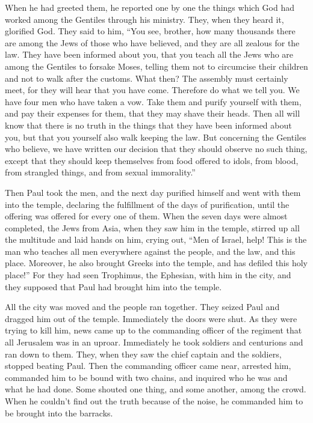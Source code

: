 {When he had greeted them, he reported one by one the things which God had worked among the Gentiles through his ministry.
They, when they heard it, glorified God. They said to him, “You see, brother, how many thousands there are among the Jews of those who have believed, and they are all zealous for the law.
They have been informed about you, that you teach all the Jews who are among the Gentiles to forsake Moses, telling them not to circumcise their children and not to walk after the customs.
What then? The assembly must certainly meet, for they will hear that you have come.
Therefore do what we tell you. We have four men who have taken a vow.
Take them and purify yourself with them, and pay their expenses for them, that they may shave their heads. Then all will know that there is no truth in the things that they have been informed about you, but that you yourself also walk keeping the law.
But concerning the Gentiles who believe, we have written our decision that they should observe no such thing, except that they should keep themselves from food offered to idols, from blood, from strangled things, and from sexual immorality.”
\par }{\PP {}Then Paul took the men, and the next day purified himself and went with them into the temple, declaring the fulfillment of the days of purification, until the offering was offered for every one of them.
When the seven days were almost completed, the Jews from Asia, when they saw him in the temple, stirred up all the multitude and laid hands on him,
crying out, “Men of Israel, help! This is the man who teaches all men everywhere against the people, and the law, and this place. Moreover, he also brought Greeks into the temple, and has defiled this holy place!”
For they had seen Trophimus, the Ephesian, with him in the city, and they supposed that Paul had brought him into the temple.
\par }{\PP {}All the city was moved and the people ran together. They seized Paul and dragged him out of the temple. Immediately the doors were shut.
As they were trying to kill him, news came up to the commanding officer of the regiment that all Jerusalem was in an uproar.
Immediately he took soldiers and centurions and ran down to them. They, when they saw the chief captain and the soldiers, stopped beating Paul.
Then the commanding officer came near, arrested him, commanded him to be bound with two chains, and inquired who he was and what he had done.
Some shouted one thing, and some another, among the crowd. When he couldn’t find out the truth because of the noise, he commanded him to be brought into the barracks.
}
